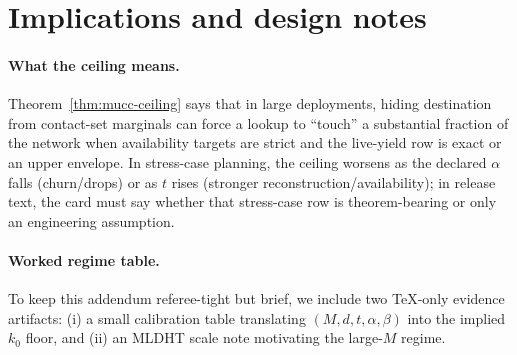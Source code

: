 \documentclass[11pt]{article}
\begin{document}
\section{Implications and design notes}
\label{sec:implications}

\paragraph{What the ceiling means.}
Theorem~\ref{thm:mucc-ceiling} says that in large deployments, hiding destination from contact-set marginals can force a lookup to ``touch'' a substantial fraction of the network when availability targets are strict and the live-yield row is exact or an upper envelope.
In stress-case planning, the ceiling worsens as the declared $\alpha$ falls (churn/drops) or as $t$ rises (stronger reconstruction/availability); in release text, the card must say whether that stress-case row is theorem-bearing or only an engineering assumption.

\paragraph{Worked regime table.}
To keep this addendum referee-tight but brief, we include two TeX-only evidence artifacts:
(i) a small calibration table translating $(M,d,t,\alpha,\beta)$ into the implied $k_0$ floor,
and (ii) an MLDHT scale note motivating the large-$M$ regime.

\begin{table}[h]
\centering
{}
\caption{Illustrative lower bounds from Theorem~\ref{thm:mucc-ceiling} with $\beta=0.05$.
The required contact fraction depends mainly on $t/(\alpha d)$.
Values above $1$ indicate that no MUCC-marginal mechanism can meet the success target under the stated exact/upper live-yield interpretation; under a lower-bound-only liveness estimate, treat the row as a conservative stress test rather than an impossibility certificate.
}
\label{tab:mucc-numbers}
\end{table}
\end{document}
